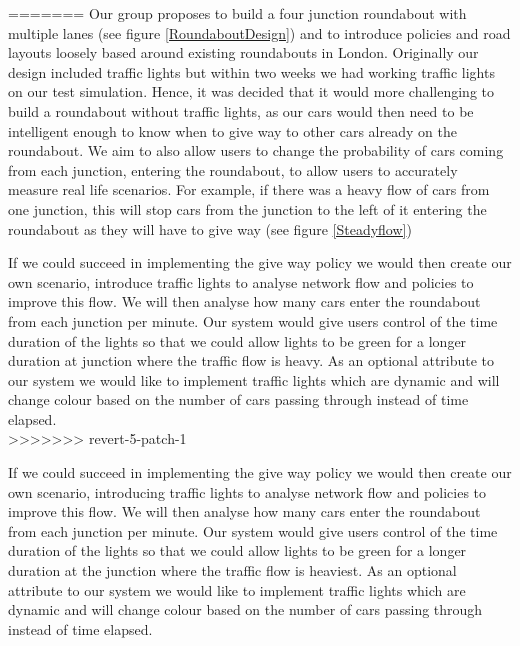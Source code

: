 \documentclass[11pt]{article}
\begin{document}
=======
	Our group proposes to build a four junction roundabout with multiple lanes (see figure \ref{RoundaboutDesign}) and to introduce policies and road layouts loosely based around existing roundabouts in London.
	 Originally our design included traffic lights but within two weeks we had working traffic lights on our test simulation.
	  Hence, it was decided that it would more challenging to build a roundabout without traffic lights, as our cars would then need to be intelligent enough to know when to give way to other cars already on the roundabout. 
	  We aim to also allow users to change the probability of cars coming from each junction, entering the roundabout, to allow users to accurately measure real life scenarios.
	   For example, if there was a heavy flow of cars from one junction, this will stop cars from the junction to the left of it entering the roundabout as they will have to give way (see figure \ref{Steadyflow})
	
	\pagebreak
	If we could succeed in implementing the give way policy we would then create our own scenario, introduce
	traffic lights to analyse network flow and policies to improve this flow. 
	We will then analyse how many cars enter the roundabout from each junction per minute. 
	Our system would give users control of the time duration of the lights so that we could allow lights to be green for a longer duration at junction where the traffic flow is heavy. 
	As an optional attribute to our system we would like to implement traffic lights which are dynamic and will change colour based on the number of cars passing through instead of time elapsed. \\
>>>>>>> revert-5-patch-1
	
	If we could succeed in implementing the give way policy we would then create our own scenario, introducing traffic lights to analyse network flow and policies to improve this flow. 
	We will then analyse how many cars enter the roundabout from each junction per minute. 
	Our system would give users control of the time duration of the lights so that we could allow lights to be green for a longer duration at the junction where the traffic flow is heaviest. 
	As an optional attribute to our system we would like to implement traffic lights which are dynamic and will change colour based on the number of cars passing through instead of time elapsed. \\
	
\end{document}
